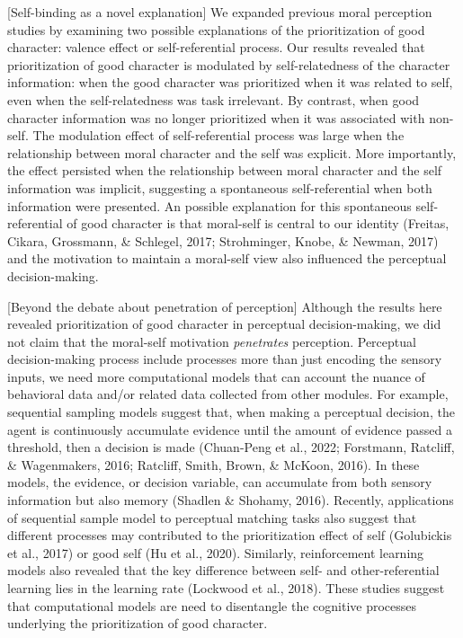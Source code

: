 \documentclass[
  man]{apa6}
\begin{document}
{[}Self-binding as a novel explanation{]} We expanded previous moral perception studies by examining two possible explanations of the prioritization of good character: valence effect or self-referential process. Our results revealed that prioritization of good character is modulated by self-relatedness of the character information: when the good character was prioritized when it was related to self, even when the self-relatedness was task irrelevant. By contrast, when good character information was no longer prioritized when it was associated with non-self. The modulation effect of self-referential process was large when the relationship between moral character and the self was explicit. More importantly, the effect persisted when the relationship between moral character and the self information was implicit, suggesting a spontaneous self-referential when both information were presented. An possible explanation for this spontaneous self-referential of good character is that moral-self is central to our identity (Freitas, Cikara, Grossmann, \& Schlegel, 2017; Strohminger, Knobe, \& Newman, 2017) and the motivation to maintain a moral-self view also influenced the perceptual decision-making.

{[}Beyond the debate about penetration of perception{]} Although the results here revealed prioritization of good character in perceptual decision-making, we did not claim that the moral-self motivation \emph{penetrates} perception. Perceptual decision-making process include processes more than just encoding the sensory inputs, we need more computational models that can account the nuance of behavioral data and/or related data collected from other modules. For example, sequential sampling models suggest that, when making a perceptual decision, the agent is continuously accumulate evidence until the amount of evidence passed a threshold, then a decision is made (Chuan-Peng et al., 2022; Forstmann, Ratcliff, \& Wagenmakers, 2016; Ratcliff, Smith, Brown, \& McKoon, 2016). In these models, the evidence, or decision variable, can accumulate from both sensory information but also memory (Shadlen \& Shohamy, 2016). Recently, applications of sequential sample model to perceptual matching tasks also suggest that different processes may contributed to the prioritization effect of self (Golubickis et al., 2017) or good self (Hu et al., 2020). Similarly, reinforcement learning models also revealed that the key difference between self- and other-referential learning lies in the learning rate (Lockwood et al., 2018). These studies suggest that computational models are need to disentangle the cognitive processes underlying the prioritization of good character.
\end{document}
